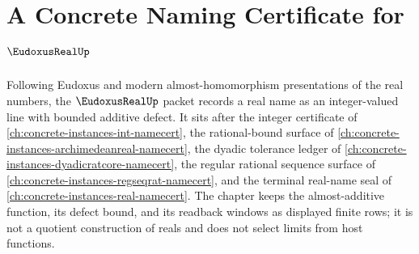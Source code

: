 \chapter{A Concrete Naming Certificate for $\EudoxusRealUp$}
\label{ch:concrete-instances-eudoxus-real-namecert}

Following Eudoxus and modern almost-homomorphism presentations of the real numbers, the $\EudoxusRealUp$ packet records a real name as an integer-valued line with bounded additive defect. It sits after the integer certificate of \autoref{ch:concrete-instances-int-namecert}, the rational-bound surface of \autoref{ch:concrete-instances-archimedeanreal-namecert}, the dyadic tolerance ledger of \autoref{ch:concrete-instances-dyadicratcore-namecert}, the regular rational sequence surface of \autoref{ch:concrete-instances-regseqrat-namecert}, and the terminal real-name seal of \autoref{ch:concrete-instances-real-namecert}. The chapter keeps the almost-additive function, its defect bound, and its readback windows as displayed finite rows; it is not a quotient construction of reals and does not select limits from host functions.


